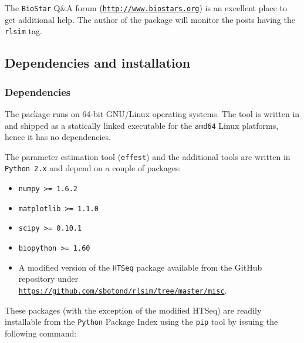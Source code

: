 The {\tt BioStar} Q\&A forum (\href{http://www.biostars.org}{\tt http://www.biostars.org}) is an excellent place to get additional help. The author of the package will monitor the posts having the \texttt{rlsim} tag.

\subsection{Dependencies and installation}
\label{ss:dep_install}

\subsubsection{Dependencies}
\label{sss:dep}

The package runs on 64-bit GNU/Linux operating systems.
The \rlsim tool is written in \go \cite{golang} and shipped as a statically linked executable for the \texttt{amd64} Linux platforms, hence it has no dependencies.


The parameter estimation tool (\texttt{effest}) and the additional tools are written in \texttt{Python 2.x} and depend on a couple of packages:

\begin{itemize}
\item \texttt{numpy >= 1.6.2} \cite{numpy}
\item \texttt{matplotlib >= 1.1.0} \cite{plt}
\item \texttt{scipy >= 0.10.1} \cite{scipy}
\item \texttt{biopython >= 1.60} \cite{biopython}
\item{A modified version of the \texttt{HTSeq} \cite{htseq} package available from the GitHub repository under\\
\texttt{\href{https://github.com/sbotond/rlsim/tree/master/misc}{https://github.com/sbotond/rlsim/tree/master/misc}}.

}
\end{itemize}

These packages (with the exception of the modified HTSeq) are readily installable from the \texttt{Python} Package Index \cite{pypi} using the \texttt{pip} tool by issuing the following command:

